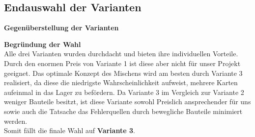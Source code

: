 \subsection{Endauswahl der Varianten}

\textbf{\large{Gegenüberstellung der Varianten}}

\begin{table}[H]
\centering
{}
    \caption{Vergleich der Varianten}
\end{table}

\textbf{\large{Begründung der Wahl}}\\
Alle drei Varianten wurden durchdacht und bieten ihre individuellen Vorteile. Durch den enormen Preis von
Variante 1 ist diese aber nicht für unser Projekt geeignet. Das optimale Konzept des Mischens wird am besten durch
Variante 3 realisiert, da diese die niedrigste Wahrscheinlichkeit aufweist, mehrere Karten aufeinmal in das Lager zu befördern.
Da Variante 3 im Vergleich zur Variante 2 weniger Bauteile besitzt, ist diese Variante sowohl Preislich ansprechender für uns
 sowie auch die Tatsache das Fehlerquellen durch bewegliche Bauteile minimiert werden. \\
Somit fällt die finale Wahl auf \textbf{Variante 3}.



